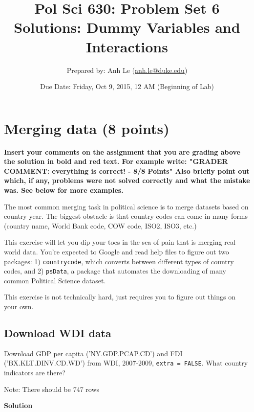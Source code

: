 \documentclass{article}\usepackage[]{graphicx}\usepackage[]{color}
\begin{document}
\title{Pol Sci 630:  Problem Set 6 Solutions: Dummy Variables and Interactions}

\author{Prepared by: Anh Le (\href{mailto:anh.le@duke.edu}{anh.le@duke.edu})}

\date{Due Date: Friday, Oct 9, 2015, 12 AM (Beginning of Lab)}

\maketitle

\section{Merging data (8 points)}

\textbf{\color{red} Insert your comments on the assignment that you are grading above the solution in bold and red text. For example write: "GRADER COMMENT: everything is correct! - 8/8 Points" Also briefly point out which, if any, problems were not solved correctly and what the mistake was. See below for more examples.}

The most common merging task in political science is to merge datasets based on country-year. The biggest obstacle is that country codes can come in many forms (country name, World Bank code, COW code, ISO2, ISO3, etc.)

This exercise will let you dip your toes in the sea of pain that is merging real world data. You're expected to Google and read help files to figure out two packages: 1) \verb`countrycode`, which converts between different types of country codes, and 2) \verb`psData`, a package that automates the downloading of many common Political Science dataset.

This exercise is not technically hard, just requires you to figure out things on your own.


\subsection{Download WDI data}

Download GDP per capita ('NY.GDP.PCAP.CD') and FDI ('BX.KLT.DINV.CD.WD') from WDI, 2007-2009, \verb`extra = FALSE`. What country indicators are there?

Note: There should be 747 rows

\textbf{Solution}
\end{document}
